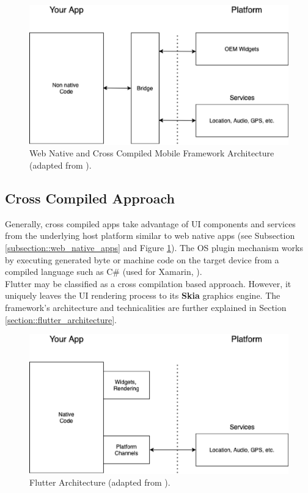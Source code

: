 \begin{figure}
    \centering
    \includegraphics[width=.8\linewidth]{images/architectures/native_web_app_architecture.eps}
    \caption{Web Native and Cross Compiled Mobile Framework Architecture (adapted from \cite{Cunha2018}).}
    \label{fig:web_native_architecture}
\end{figure}

\subsection{Cross Compiled Approach} \label{subsection::cross_compiled_approach}
Generally, cross compiled apps take advantage of UI components and services from the underlying host platform similar to web native apps (see Subsection \ref{subsection::web_native_apps} and Figure \ref{fig:web_native_architecture}).
The OS plugin mechanism works by executing generated byte or machine code on the target device from a compiled language such as C\# (used for Xamarin, \cite{Xamarin2021}).\\
Flutter may be classified as a cross compilation based approach. However, it uniquely leaves the UI rendering process to its \textbf{Skia} graphics engine.
The framework's architecture and technicalities are further explained in Section \ref{section::flutter_architecture}.

\begin{figure}
    \centering
    \includegraphics[width=.8\linewidth]{images/architectures/flutter_architecture.eps}
    \caption{Flutter Architecture (adapted from \cite{Cunha2018}).}
    \label{fig:flutter_architecture}
\end{figure}

